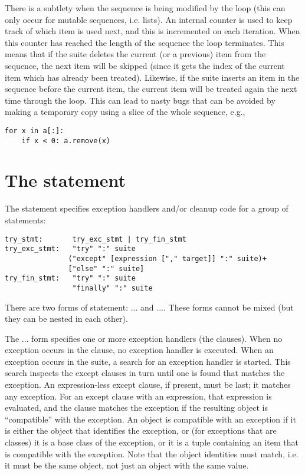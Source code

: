  There is a subtlety when the sequence is being modified
by the loop (this can only occur for mutable sequences, i.e. lists).
An internal counter is used to keep track of which item is used next,
and this is incremented on each iteration.  When this counter has
reached the length of the sequence the loop terminates.  This means that
if the suite deletes the current (or a previous) item from the
sequence, the next item will be skipped (since it gets the index of
the current item which has already been treated).  Likewise, if the
suite inserts an item in the sequence before the current item, the
current item will be treated again the next time through the loop.
This can lead to nasty bugs that can be avoided by making a temporary
copy using a slice of the whole sequence, e.g.,

\begin{verbatim}
for x in a[:]:
    if x < 0: a.remove(x)
\end{verbatim}

\section{The  statement\label{try}}

The  statement specifies exception handlers and/or cleanup
code for a group of statements:

\begin{verbatim}
try_stmt:       try_exc_stmt | try_fin_stmt
try_exc_stmt:   "try" ":" suite
               ("except" [expression ["," target]] ":" suite)+
               ["else" ":" suite]
try_fin_stmt:   "try" ":" suite
                "finally" ":" suite
\end{verbatim}

There are two forms of  statement:
... and
....  These forms cannot be mixed (but
they can be nested in each other).

The ... form specifies one or more
exception handlers
(the  clauses).  When no exception occurs in the
 clause, no exception handler is executed.  When an
exception occurs in the  suite, a search for an exception
handler is started.  This search inspects the except clauses in turn until
one is found that matches the exception.  An expression-less except
clause, if present, must be last; it matches any exception.  For an
except clause with an expression, that expression is evaluated, and the
clause matches the exception if the resulting object is ``compatible''
with the exception.  An object is compatible with an exception if it
is either the object that identifies the exception, or (for exceptions
that are classes) it is a base class of the exception, or it is a
tuple containing an item that is compatible with the exception.  Note
that the object identities must match, i.e. it must be the same
object, not just an object with the same value.

